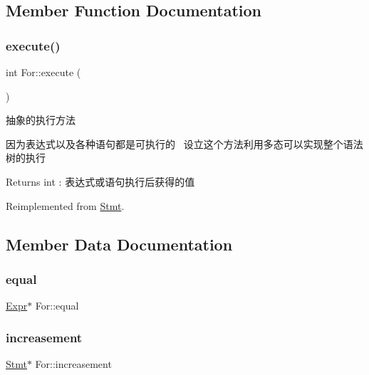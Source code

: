 \subsection{Member Function Documentation}
\mbox{\label{class_for_ad099d6d48c640dd5127285e59bbaba15}} 
\subsubsection{\texorpdfstring{execute()}{execute()}}
{\footnotesize\ttfamily int For\+::execute (\begin{DoxyParamCaption}{ }\end{DoxyParamCaption})\hspace{0.3cm}{\ttfamily [virtual]}}



抽象的执行方法 

因为表达式以及各种语句都是可执行的~\newline
设立这个方法利用多态可以实现整个语法树的执行~\newline
 \begin{DoxyReturn}{Returns}
int \+: 表达式或语句执行后获得的值 
\end{DoxyReturn}


Reimplemented from \hyperlink{class_stmt_abdc3261770c3c5bd3ce5b3ba6eedfaa4}{Stmt}.



\subsection{Member Data Documentation}
\mbox{\label{class_for_a215e09b14cddca31190dc69cd783d886}} 
\subsubsection{\texorpdfstring{equal}{equal}}
{\footnotesize\ttfamily \hyperlink{class_expr}{Expr}$\ast$ For\+::equal}

\mbox{\label{class_for_a2d0ace8af086310ef5a11d9641dc81e6}} 
\subsubsection{\texorpdfstring{increasement}{increasement}}
{\footnotesize\ttfamily \hyperlink{class_stmt}{Stmt}$\ast$ For\+::increasement}

